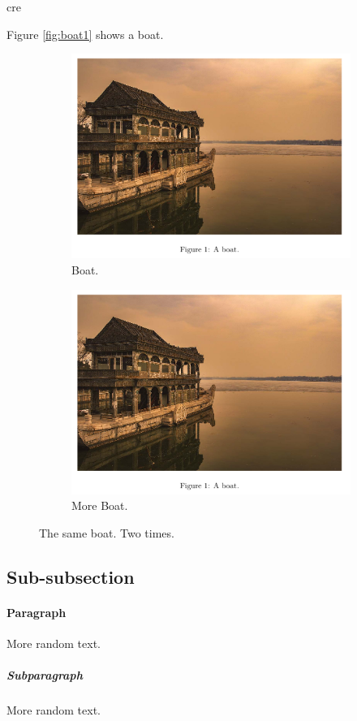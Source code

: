 cre\documentclass{article}
\begin{document}
	Figure \ref{fig:boat1} shows a boat.
	
	\begin{figure}[!ht]
		\centering
		\begin{subfigure}[b]{0.4\linewidth}
			\includegraphics[width=\linewidth]{source/boat.jpg}
			\caption{Boat.}
		\end{subfigure}
		\begin{subfigure}[b]{0.4\linewidth}
			\includegraphics[width=\linewidth]{source/boat.jpg}
			\caption{More Boat.}
		\end{subfigure}
		\caption{The same boat. Two times.}
		\label{fig:coffee}
	\end{figure}
	
	
	\subsection{Sub-subsection}
	
	\paragraph{Paragraph}
	More random text.
	
	\subparagraph{Subparagraph}
	More random text.
	
\end{document}
